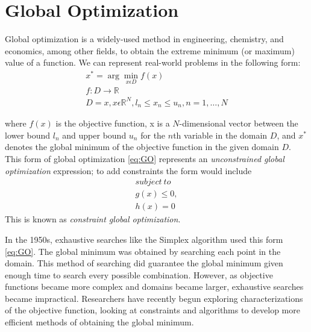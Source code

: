 \chapter{Global Optimization}
\label{background}
Global optimization is a widely-used method in engineering, chemistry, and economics, among other fields, to obtain the extreme minimum (or maximum) value of a function. We can represent real-world problems in the following form:
\begin{align}
  \label{eq:GO}
  x^* = \arg \min_{x \epsilon D} f(x) \nonumber \\
  f:D\rightarrow \mathbb{R} \\ 
  D = {x,x\epsilon \mathbb{R}^{N},l_n\leq x_n \leq u_n, n = 1,\ldots,N} \nonumber
\end{align}

where $f(x)$ is the objective function, x is a $N$-dimensional vector between the lower bound $l_n$ and upper bound $u_n$ for the $n$th variable in the domain $D$, and $x^*$ denotes the global minimum of the objective function in the given domain $D$. This form of global optimization \ref{eq:GO} represents an \textit{unconstrained global optimization} expression; to add constraints the form would include 
\begin{align}
  \label{eq:constrainedGO}
  subject\ to \nonumber \\
    g(x) \leq 0, \\ 
    h(x) = 0 \nonumber
\end{align}
This is known as \textit{constraint global optimization}.

In the 1950s, exhaustive searches like the Simplex algorithm \cite{Liberti2000} used this form \ref{eq:GO}. The global minimum was obtained by searching each point in the domain. This method of searching did guarantee the global minimum given enough time to search every possible combination. However, as objective functions became more complex and domains became larger, exhaustive searches became impractical. Researchers have recently begun exploring characterizations of the objective function, looking at constraints and algorithms to develop more efficient methods of obtaining the global minimum. 

 
